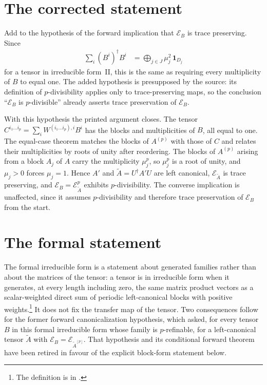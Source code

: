 \documentclass{article}
\begin{document}
\section{The corrected statement}

Add to the hypothesis of the forward implication that $\mathcal E_B$ is trace
preserving. Since
\begin{align}
    \sum_i (B^i)^\dagger B^i
     & =\bigoplus_{j\in J}\mu_j^2\,\mathbf 1_{D_j}
    \label{eq:dccsp17_thm41_forward_trace_preservation_trace_condition}
\end{align}
for a tensor in irreducible form~II, this is the same as requiring every
multiplicity of $B$ to equal one. The added hypothesis is presupposed by the
source: its definition of $p$-divisibility applies only to trace-preserving
maps, so the conclusion ``$\mathcal E_B$ is $p$-divisible'' already asserts
trace preservation of $\mathcal E_B$.

With this hypothesis the printed argument closes. The tensor
$C^{i_1\ldots i_p}=\sum_i W^{(i_1\ldots i_p),i}B^i$ has the blocks and
multiplicities of $B$, all equal to one. The equal-case theorem
\cite[Theorem~3.8]{DeLasCuevas2017Irreducible} matches the blocks of
$A^{(p)}$ with those of $C$ and relates their multiplicities by roots of
unity after reordering. The blocks of $A^{(p)}$ arising from a block $A_j$ of
$A$ carry the multiplicity $\mu_j^p$, so $\mu_j^p$ is a root of unity, and
$\mu_j>0$ forces $\mu_j=1$. Hence $A'$ and $\widetilde A=U^\dagger A'U$ are
left canonical, $\mathcal E_{\widetilde A}$ is trace preserving, and
$\mathcal E_B=\mathcal E_{\widetilde A}^p$ exhibits $p$-divisibility. The
converse implication is unaffected, since it assumes $p$-divisibility and
therefore trace preservation of $\mathcal E_B$ from the start.

\section{The formal statement}

The formal irreducible form is a statement about generated families rather
than about the matrices of the tensor: a tensor is in irreducible form when it
generates, at every length including zero, the same matrix product vectors as
a scalar-weighted direct sum of periodic left-canonical blocks with positive
weights.\footnote{The definition is  in
    .} It does not fix the transfer map of the
tensor. Two consequences follow for the former forward canonicalization
hypothesis, which asked, for every tensor $B$ in this formal irreducible form
whose family is $p$-refinable, for a left-canonical tensor $\widetilde A$ with
$\mathcal E_B=\mathcal E_{\widetilde A^{[p]}}$. That hypothesis and its
conditional forward theorem have been retired in favour of the explicit
block-form statement below.
\end{document}
